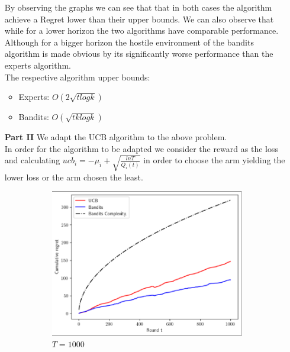 \documentclass[12pt]{article}
\begin{document}
\begin{enumerate}
		\newpage
		By observing the graphs we can see that that in both cases the algorithm achieve a Regret lower than their upper bounds. We can also observe that while for a lower horizon the two algorithms have comparable performance. Although for a bigger horizon the hostile environment of the bandits algorithm is made obvious by its significantly worse performance than the experts algorithm.\\
		
		The respective algorithm upper bounds:
		\begin{itemize}
			\item Experts: $O(2\sqrt{tlogk})$
			\item Bandits: $O(\sqrt{tklogk})$
		\end{itemize}
		\item[{\bf Part II}]
		We adapt the UCB algorithm to the above problem.\\
		In order for the  algorithm to be adapted we consider the reward as the loss and calculating $ucb_i=-\mu_i + \sqrt{\frac{lnT}{Q_i(t)}}$ in order to choose the arm yielding the lower loss or the arm chosen the least.
		\begin{figure}[h!]
			\centering
			\begin{subfigure}[b]{0.45\textwidth}
				\centering
				\includegraphics[width=\textwidth]{fig3.png}
				\caption{$T=1000$}
			\end{subfigure}
			\hfill
			\begin{subfigure}[b]{0.45\textwidth}
				\centering

\end{subfigure}
\end{figure}
\end{enumerate}
\end{document}
